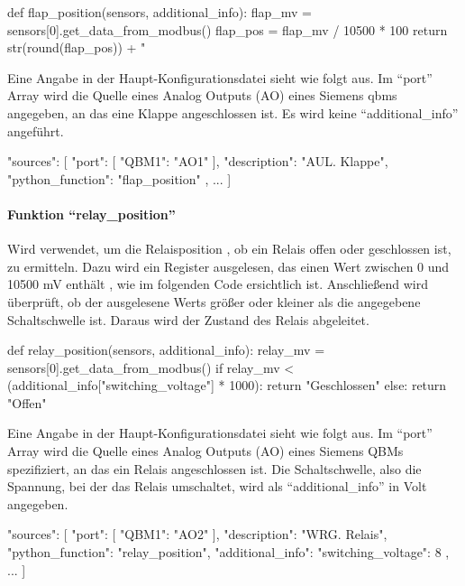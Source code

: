 \begin{pythoncode}
def flap_position(sensors, additional_info):
	flap_mv = sensors[0].get_data_from_modbus()
	flap_pos = flap_mv / 10500 * 100
	return str(round(flap_pos)) + " %
\end{pythoncode}

Eine Angabe in der Haupt-Konfigurationsdatei sieht wie folgt aus. Im \enquote{port} Array wird die Quelle eines Analog Outputs (AO) eines Siemens \gls{qbm}s angegeben, an das eine Klappe angeschlossen ist. Es wird keine \enquote{additional\_info} angeführt.

\begin{jsoncode}
"sources": [
	{
		"port": [
			{"QBM1": "AO1"}
		],
		"description": "AUL. Klappe",
		"python_function": "flap_position"
	},
	...
]
\end{jsoncode}



\paragraph{Funktion \enquote{relay\_position}}
Wird verwendet, um die Relaisposition \bzw, ob ein Relais offen oder geschlossen ist, zu ermitteln. Dazu wird ein Register ausgelesen, das einen Wert zwischen 0 und 10500 mV enthält \cite[vgl.][17]{siemens:2021}, wie im folgenden Code ersichtlich ist. Anschließend wird überprüft, ob der ausgelesene Werts größer oder kleiner als die angegebene Schaltschwelle ist. Daraus wird der Zustand des Relais abgeleitet.

\begin{pythoncode}
def relay_position(sensors, additional_info):
	relay_mv = sensors[0].get_data_from_modbus()
	if relay_mv < (additional_info["switching_voltage"] * 1000):
		return "Geschlossen"
	else:
		return "Offen"

\end{pythoncode}

Eine Angabe in der Haupt-Konfigurationsdatei sieht wie folgt aus. Im \enquote{port} Array wird die Quelle eines Analog Outputs (AO) eines Siemens QBMs spezifiziert, an das ein Relais angeschlossen ist. Die Schaltschwelle, also die Spannung, bei der das Relais umschaltet, wird als \enquote{additional\_info} in Volt angegeben.

\begin{jsoncode}
"sources": [
	{
		"port": [
			{"QBM1": "AO2"}
		],
		"description": "WRG. Relais",
		"python_function": "relay_position",
		"additional_info": {"switching_voltage": 8}
	},
	...
]
\end{jsoncode}